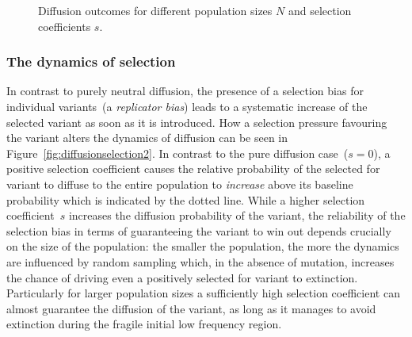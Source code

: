 \begin{knitrout}
\color{fgcolor}\begin{figure}[htbp]

{\centering {}

}

\caption[Diffusion outcomes for different population sizes ]{Diffusion outcomes for different population sizes $N$ and selection coefficients $s$.}\label{fig:diffusionselection}
\end{figure}


\end{knitrout}

\subsubsection{The dynamics of selection}

In contrast to purely neutral diffusion, the presence of a selection bias for individual variants~(a \emph{replicator bias}) leads to a systematic increase of the selected variant as soon as it is introduced. How a selection pressure favouring the variant alters the dynamics of diffusion can be seen in Figure~\ref{fig:diffusionselection2}. In contrast to the pure diffusion case~($s=0$), a positive selection coefficient causes the relative probability of the selected for variant to diffuse to the entire population to \emph{increase} above its baseline probability which is indicated by the dotted line.
While a higher selection coefficient~$s$ increases the diffusion probability of the variant, the reliability of the selection bias in terms of guaranteeing the variant to win out depends crucially on the size of the population: the smaller the population, the more the dynamics are influenced by random sampling which, in the absence of mutation, increases the chance of driving even a positively selected for variant to extinction. Particularly for larger population sizes a sufficiently high selection coefficient can almost guarantee the diffusion of the variant, as long as it manages to avoid extinction during the fragile initial low frequency region.

